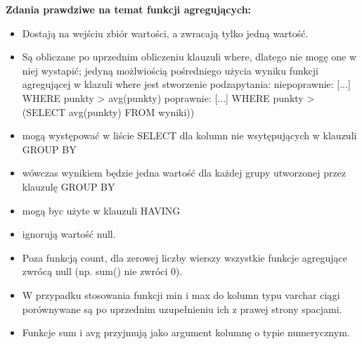 \noindent \textbf {Zdania prawdziwe na temat funkcji agregujących:} 
\begin{itemize}
	\item Dostają na wejściu zbiór wartości, a zwracają tylko jedną wartość.
	\item Są obliczane po uprzednim obliczeniu klauzuli where, dlatego nie mogę one w niej wystapić; jedyną możlwiością pośredniego użycia wyniku funkcji agregującej w klazuli where jest stworzenie podzapytania:
niepoprawnie: [...] WHERE punkty > avg(punkty) 
poprawnie: [...] WHERE punkty > (SELECT avg(punkty) FROM wyniki))
	\item mogą występować w liście SELECT dla kolumn nie wsytępujących w klauzuli GROUP BY
	\item wówczas wynikiem będzie jedna wartość dla każdej grupy utworzonej przez klauzulę GROUP BY
	\item mogą byc użyte w klauzuli HAVING
	\item ignorują wartość null.
	\item Poza funkcją count, dla zerowej liczby wierszy wszystkie funkcje agregujące zwrócą null (np. sum() nie zwróci 0).
	\item W przypadku stosowania funkcji min i max do kolumn typu varchar ciągi porównywane są po uprzednim uzupełnieniu ich z prawej strony spacjami.
	\item Funkcje sum i avg przyjmują jako argument kolumnę o typie numerycznym.
\end{itemize}


